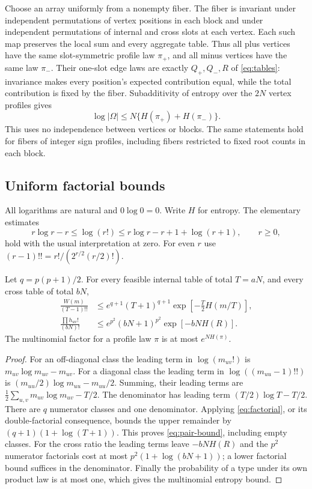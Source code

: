Choose an array uniformly from a nonempty fiber. The fiber is
invariant under independent permutations of vertex positions in each
block and under independent permutations of internal and cross slots
at each vertex. Each such map preserves the local sum and every
aggregate table. Thus all plus vertices have the same slot-symmetric
profile law $\pi_+$, and all minus vertices have the same law $\pi_-$.
Their one-slot edge laws are exactly $Q_+,Q_-,R$ of
\eqref{eq:tables}: invariance makes every position's expected
contribution equal, while the total contribution is fixed by the
fiber. Subadditivity of entropy over the $2N$ vertex profiles gives
\begin{equation}\label{eq:fiber-subadditivity}
 \log|\Omega|\le N\{H(\pi_+)+H(\pi_-)\}.
\end{equation}
This uses no independence between vertices or blocks. The same
statements hold for fibers of integer sign profiles, including fibers
restricted to fixed root counts in each block.

\subsection{Uniform factorial bounds}
All logarithms are natural and $0\log0=0$. Write $H$ for entropy.
The elementary estimates
\begin{equation}\label{eq:factorial}
 r\log r-r\le\log(r!)
 \le r\log r-r+1+\log(r+1),\qquad r\ge0,
\end{equation}
hold with the usual interpretation at zero. For even $r$ use
$(r-1)!!=r!/(2^{r/2}(r/2)!)$.

\begin{lemma}\label{lem:factorial-bounds}
Let $q=p(p+1)/2$. For every feasible internal table of total $T=aN$,
and every cross table of total $bN$,
\begin{align}
 \frac{W(m)}{(T-1)!!}
 &\le e^{q+1}(T+1)^{q+1}
       \exp\!\left[-\frac T2H(m/T)\right],\label{eq:pair-bound}\\
 \frac{\prod h_{uv}!}{(bN)!}
 &\le e^{p^2}(bN+1)^{p^2}\exp[-bNH(R)].\label{eq:cross-bound}
\end{align}
The multinomial factor for a profile law $\pi$ is at most $e^{NH(\pi)}$.
\end{lemma}
\begin{proof}
For an off-diagonal class the leading term in $\log(m_{uv}!)$ is
$m_{uv}\log m_{uv}-m_{uv}$. For a diagonal class the leading term
in $\log((m_{uu}-1)!!)$ is
$(m_{uu}/2)\log m_{uu}-m_{uu}/2$. Summing, their leading terms are
$\tfrac12\sum_{u,v}m_{uv}\log m_{uv}-T/2$.
The denominator has leading term $(T/2)\log T-T/2$.
There are $q$ numerator classes and one denominator. Applying
\eqref{eq:factorial}, or its double-factorial consequence, bounds
the upper remainder by $(q+1)(1+\log(T+1))$. This proves
\eqref{eq:pair-bound}, including empty classes.
For the cross ratio the leading terms leave $-bNH(R)$ and the
$p^2$ numerator factorials cost at most
$p^2(1+\log(bN+1))$; a lower factorial bound suffices in the denominator.
Finally the probability of a type under its own product law is at
most one, which gives the multinomial entropy bound.
\end{proof}

